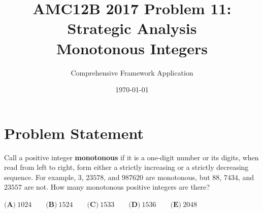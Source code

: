 \documentclass[]{article}
\begin{document}
\title{AMC12B 2017 Problem 11: Strategic Analysis\\Monotonous Integers}
\author{Comprehensive Framework Application}
\date{\today}
\maketitle

\section*{Problem Statement}

Call a positive integer \textbf{monotonous} if it is a one-digit number or its digits, when read from left to right, form either a strictly increasing or a strictly decreasing sequence. For example, $3$, $23578$, and $987620$ are monotonous, but $88$, $7434$, and $23557$ are not. How many monotonous positive integers are there?

\begin{center}
$\textbf{(A)}\ 1024 \qquad \textbf{(B)}\ 1524 \qquad \textbf{(C)}\ 1533 \qquad \textbf{(D)}\ 1536 \qquad \textbf{(E)}\ 2048$
\end{center}
\end{document}
